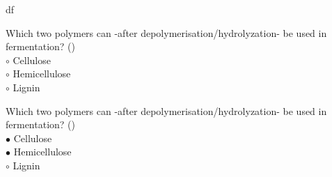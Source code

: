 df\documentclass[]{beamer}
\begin{document}
\begin{CJK}{UTF8}{gbsn}
\begin{frame}[shrink] {}
\addtocounter{questions}{1}
\color{blue}
Which two polymers can -after depolymerisation/hydrolyzation- be used in fermentation?
({})\\
\color{black}
\setlength{\parindent}{-0.4cm}
{\color{red}$\circ$}  Cellulose  \\
{\color{red}$\circ$}  Hemicellulose  \\
{\color{red}$\circ$} Lignin  \\
\end{frame}
\begin{frame}[shrink] {}
\addtocounter{answers}{1}
\color{blue}
Which two polymers can -after depolymerisation/hydrolyzation- be used in fermentation?
({})\\
\color{black}
\setlength{\parindent}{-0.4cm}
{\color{red}$\bullet$} Cellulose  \\
{\color{red}$\bullet$} Hemicellulose  \\
{\color{red}$\circ$} Lignin  \\
\end{frame}



\end{CJK}
\end{document}
